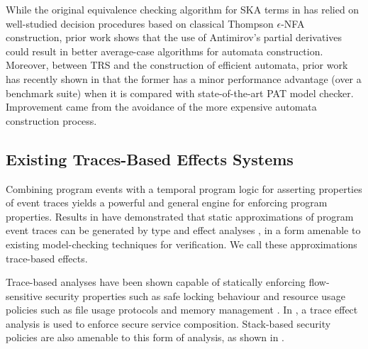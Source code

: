 \documentclass[acmsmall,review,anonymous]{acmart}\settopmatter{printfolios=true,printccs=false,printacmref=false}
\newcommand{\code}[1]{{\tt{\ensuremath{\m{#1}}}}}
\newcommand{\m}{\mathit}
\begin{document}

While the original equivalence checking algorithm for SKA terms in \cite{prisacariu2010synchronous} has
relied on well-studied decision procedures based on classical Thompson \code{\epsilon}-NFA construction, prior work \cite{broda2015deciding}  shows that the use of Antimirov's partial derivatives
could result in better average-case algorithms for automata construction. 
Moreover, between TRS and the construction of efficient automata, prior work has recently shown in \cite{song2020automated} that the former has a minor performance advantage (over a benchmark suite) when it is compared with state-of-the-art PAT \cite{sun2009pat} model checker.
Improvement came from the avoidance of the more expensive automata construction process.



\subsection{Existing Traces-Based Effects Systems} 



Combining program events with a temporal program logic for asserting properties of event traces yields a powerful and general engine for enforcing program properties. Results in \cite{skalka2008types,skalka2004history,marriott2003resource} have demonstrated that static approximations of program event traces can be generated by type and effect analyses \cite{talpin1994type,amtoft1999type}, in a form amenable to existing model-checking techniques for verification. We call these approximations trace-based effects.

Trace-based analyses have been shown capable of statically enforcing flow-sensitive security properties such as safe locking behaviour \cite{foster2002flow} and resource usage policies such as file usage protocols and memory management \cite{marriott2003resource}. In \cite{bartoletti2005enforcing}, a trace effect analysis is used to enforce secure service composition. 
 Stack-based security policies are also amenable to this form of analysis, as shown in \cite{skalka2004history}. 
 
\end{document}
